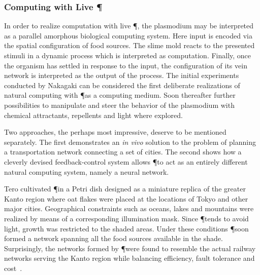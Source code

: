 			\FloatBarrier

		\subsubsection{Computing with Live \P}

			In order to realize computation with live \P, the plasmodium may be interpreted as a parallel amorphous biological computing system. Here input is encoded via the spatial configuration of food sources. The slime mold reacts to the presented stimuli in a dynamic process which is interpreted as computation. Finally, once the organism has settled in response to the input, the configuration of its vein network is interpreted as the output of the process. The initial experiments conducted by Nakagaki \etal can be considered the first deliberate realizations of natural computing with \P as a computing medium. Soon thereafter further possibilities to manipulate and steer the behavior of the plasmodium with chemical attractants, repellents and light where explored.  

			Two approaches, the perhaps most impressive, deserve to be mentioned separately. The first demonstrates an \textit{in vivo} solution to the problem of planning a transportation network connecting a set of cities. The second shows how a cleverly devised feedback-control system allows \P to act as an entirely different natural computing system, namely a neural network.

			Tero \etal cultivated \P in a Petri dish designed as a miniature replica of the greater Kanto region where oat flakes were placed at the locations of Tokyo and other major cities. Geographical constraints such as oceans, lakes and mountains were realized by means of a corresponding illumination mask. Since \P tends to avoid light, growth was restricted to the shaded areas. Under these conditions \P soon formed a network spanning all the food sources available in the shade. Surprisingly, the networks formed by \P were found to resemble the actual railway networks serving the Kanto region while balancing efficiency, fault tolerance and cost~\cite{tero2010rules}. 

